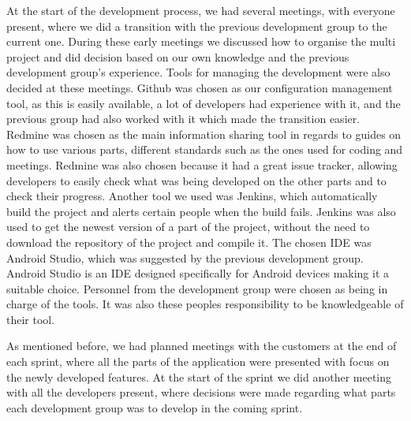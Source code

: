 At the start of the development process, we had several meetings, with everyone present, where we did a transition with the previous development group to the current one.
During these early meetings we discussed how to organise the multi project and did decision based on our own knowledge and the previous development group's experience.
Tools for managing the development were also decided at these meetings.
Github was chosen as our configuration management tool, as this is easily available, a lot of developers had experience with it, and the previous group had also worked with it which made the transition easier.
Redmine was chosen as the main information sharing tool in regards to guides on how to use various parts, different standards such as the ones used for coding and meetings.
Redmine was also chosen because it had a great issue tracker, allowing developers to easily check what was being developed on the other parts and to check their progress.
Another tool we used was Jenkins, which automatically build the project and alerts certain people when the build fails.
Jenkins was also used to get the newest version of a part of the project, without the need to download the repository of the project and compile it.
The chosen IDE was Android Studio, which was suggested by the previous development group. Android Studio is an IDE designed specifically for Android devices making it a suitable choice.
Personnel from the development group were chosen as being in charge of the tools.
It was also these peoples responsibility to be knowledgeable of their tool.

As mentioned before, we had planned meetings with the customers at the end of each sprint, where all the parts of the application were presented with focus on the newly developed features.
At the start of the sprint we did another meeting with all the developers present, where decisions were made regarding what parts each development group was to develop in the coming sprint.

